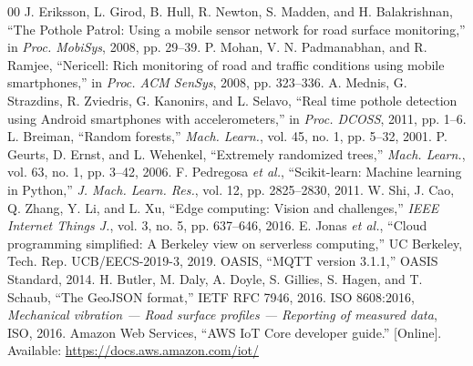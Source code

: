\documentclass[conference]{IEEEtran}
\begin{document}
\begin{thebibliography}{00}
 J. Eriksson, L. Girod, B. Hull, R. Newton, S. Madden, and H. Balakrishnan, ``The Pothole Patrol: Using a mobile sensor network for road surface monitoring,'' in \emph{Proc. MobiSys}, 2008, pp. 29--39.
 P. Mohan, V. N. Padmanabhan, and R. Ramjee, ``Nericell: Rich monitoring of road and traffic conditions using mobile smartphones,'' in \emph{Proc. ACM SenSys}, 2008, pp. 323--336.
 A. Mednis, G. Strazdins, R. Zviedris, G. Kanonirs, and L. Selavo, ``Real time pothole detection using Android smartphones with accelerometers,'' in \emph{Proc. DCOSS}, 2011, pp. 1--6.
 L. Breiman, ``Random forests,'' \emph{Mach. Learn.}, vol. 45, no. 1, pp. 5--32, 2001.
 P. Geurts, D. Ernst, and L. Wehenkel, ``Extremely randomized trees,'' \emph{Mach. Learn.}, vol. 63, no. 1, pp. 3--42, 2006.
 F. Pedregosa \emph{et al.}, ``Scikit-learn: Machine learning in Python,'' \emph{J. Mach. Learn. Res.}, vol. 12, pp. 2825--2830, 2011.
 W. Shi, J. Cao, Q. Zhang, Y. Li, and L. Xu, ``Edge computing: Vision and challenges,'' \emph{IEEE Internet Things J.}, vol. 3, no. 5, pp. 637--646, 2016.
 E. Jonas \emph{et al.}, ``Cloud programming simplified: A Berkeley view on serverless computing,'' UC Berkeley, Tech. Rep. UCB/EECS-2019-3, 2019.
 OASIS, ``MQTT version 3.1.1,'' OASIS Standard, 2014.
 H. Butler, M. Daly, A. Doyle, S. Gillies, S. Hagen, and T. Schaub, ``The GeoJSON format,'' IETF RFC 7946, 2016.
 ISO 8608:2016, \emph{Mechanical vibration --- Road surface profiles --- Reporting of measured data}, ISO, 2016.
 Amazon Web Services, ``AWS IoT Core developer guide.'' [Online]. Available: \url{https://docs.aws.amazon.com/iot/}
\end{thebibliography}
\end{document}
